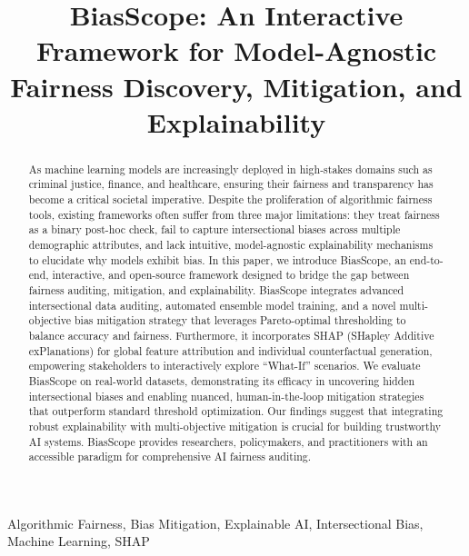 \documentclass[conference]{IEEEtran}
\begin{document}
\title{BiasScope: An Interactive Framework for Model-Agnostic Fairness Discovery, Mitigation, and Explainability}

\author{
}

\maketitle

\begin{abstract}
As machine learning models are increasingly deployed in high-stakes domains such as criminal justice, finance, and healthcare, ensuring their fairness and transparency has become a critical societal imperative. Despite the proliferation of algorithmic fairness tools, existing frameworks often suffer from three major limitations: they treat fairness as a binary post-hoc check, fail to capture intersectional biases across multiple demographic attributes, and lack intuitive, model-agnostic explainability mechanisms to elucidate why models exhibit bias. In this paper, we introduce BiasScope, an end-to-end, interactive, and open-source framework designed to bridge the gap between fairness auditing, mitigation, and explainability. BiasScope integrates advanced intersectional data auditing, automated ensemble model training, and a novel multi-objective bias mitigation strategy that leverages Pareto-optimal thresholding to balance accuracy and fairness. Furthermore, it incorporates SHAP (SHapley Additive exPlanations) for global feature attribution and individual counterfactual generation, empowering stakeholders to interactively explore ``What-If'' scenarios. We evaluate BiasScope on real-world datasets, demonstrating its efficacy in uncovering hidden intersectional biases and enabling nuanced, human-in-the-loop mitigation strategies that outperform standard threshold optimization. Our findings suggest that integrating robust explainability with multi-objective mitigation is crucial for building trustworthy AI systems. BiasScope provides researchers, policymakers, and practitioners with an accessible paradigm for comprehensive AI fairness auditing.
\end{abstract}

\begin{IEEEkeywords}
Algorithmic Fairness, Bias Mitigation, Explainable AI, Intersectional Bias, Machine Learning, SHAP
\end{IEEEkeywords}
\end{document}
